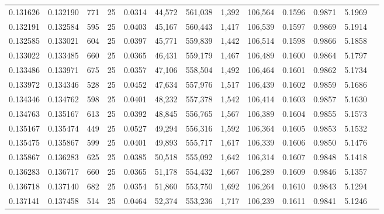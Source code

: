 \begin{tabular}{rrrrrrrrrrrrr}
0.131626 & 0.132190 &   771 &  25 &                                     0.0314 &  44,572 & 561,038 &   1,392 & 106,564 & 0.1596 & 0.9871 & 5.1969 \\
0.132191 & 0.132584 &   595 &  25 &                                     0.0403 &  45,167 & 560,443 &   1,417 & 106,539 & 0.1597 & 0.9869 & 5.1914 \\
0.132585 & 0.133021 &   604 &  25 &                                     0.0397 &  45,771 & 559,839 &   1,442 & 106,514 & 0.1598 & 0.9866 & 5.1858 \\
0.133022 & 0.133485 &   660 &  25 &                                     0.0365 &  46,431 & 559,179 &   1,467 & 106,489 & 0.1600 & 0.9864 & 5.1797 \\
0.133486 & 0.133971 &   675 &  25 &                                     0.0357 &  47,106 & 558,504 &   1,492 & 106,464 & 0.1601 & 0.9862 & 5.1734 \\
0.133972 & 0.134346 &   528 &  25 &                                     0.0452 &  47,634 & 557,976 &   1,517 & 106,439 & 0.1602 & 0.9859 & 5.1686 \\
0.134346 & 0.134762 &   598 &  25 &                                     0.0401 &  48,232 & 557,378 &   1,542 & 106,414 & 0.1603 & 0.9857 & 5.1630 \\
0.134763 & 0.135167 &   613 &  25 &                                     0.0392 &  48,845 & 556,765 &   1,567 & 106,389 & 0.1604 & 0.9855 & 5.1573 \\
0.135167 & 0.135474 &   449 &  25 &                                     0.0527 &  49,294 & 556,316 &   1,592 & 106,364 & 0.1605 & 0.9853 & 5.1532 \\
0.135475 & 0.135867 &   599 &  25 &                                     0.0401 &  49,893 & 555,717 &   1,617 & 106,339 & 0.1606 & 0.9850 & 5.1476 \\
0.135867 & 0.136283 &   625 &  25 &                                     0.0385 &  50,518 & 555,092 &   1,642 & 106,314 & 0.1607 & 0.9848 & 5.1418 \\
0.136283 & 0.136717 &   660 &  25 &                                     0.0365 &  51,178 & 554,432 &   1,667 & 106,289 & 0.1609 & 0.9846 & 5.1357 \\
0.136718 & 0.137140 &   682 &  25 &                                     0.0354 &  51,860 & 553,750 &   1,692 & 106,264 & 0.1610 & 0.9843 & 5.1294 \\
0.137141 & 0.137458 &   514 &  25 &                                     0.0464 &  52,374 & 553,236 &   1,717 & 106,239 & 0.1611 & 0.9841 & 5.1246 \\

\end{tabular}
